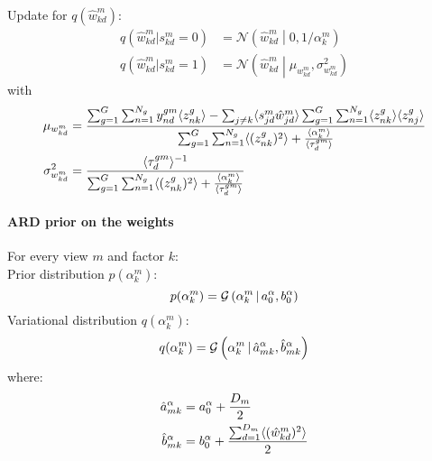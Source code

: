 Update for $q(\hat{w}_{kd}^m)$:
\begin{equation} \begin{aligned}
      q(\hat{w}_{kd}^m|s_{kd}^m=0) &= \mathcal{N} \left(\hat{w}_{kd}^m \middle| 0, 1/\alpha_k^m \right) \\
      q(\hat{w}_{kd}^m|s_{kd}^m=1) &= \mathcal{N} \left( \hat{w}_{kd}^m \middle| \mu_{w_{kd}^m}, \sigma_{w_{kd}^m}^2\right)
  \end{aligned} \end{equation}
with
\begin{equation} \begin{aligned}
  	\mu_{w_{kd}^m} &= \frac{ \sum_{g=1}^G\sum_{n=1}^{N_g} y_{nd}^{gm} \langle z^g_{nk} \rangle - \sum_{j \neq k} \langle s_{jd}^m\hat{w}_{jd}^m \rangle \sum_{g=1}^G\sum_{n=1}^{N_g} \langle z^g_{nk} \rangle \langle z^g_{nj} \rangle } { \sum_{g=1}^G\sum_{n=1}^{N_g} \langle (z_{nk}^g)^2 \rangle + \frac{\langle\alpha_k^m\rangle}{\langle\tau_d^{gm}\rangle} }\\
  	\sigma_{w_{kd}^m}^2 &= \frac{ \langle\tau_d^{gm}\rangle^{-1} } { \sum_{g=1}^G\sum_{n=1}^{N_g} \langle (z_{nk}^g)^2 \rangle + \frac{\langle\alpha_k^m\rangle}{\langle\tau_d^{gm}\rangle} }
\end{aligned} \end{equation}



\paragraph*{ARD prior on the weights}

For every view $m$ and factor $k$: \\

Prior distribution $p(\alpha_k^m)$:
\[
	p(\alpha_k^m) = \mathcal{G}\left(\alpha_k^m \,|\, a_0^\alpha, b_0^\alpha\right)
\]
Variational distribution $q(\alpha_k^m)$:
\begin{equation}
    q(\alpha^m_{k}) = \mathcal{G}\left(\alpha_k^m \,|\, \hat{a}_{mk}^{\alpha}, \hat{b}_{mk}^{\alpha}\right)
\end{equation}
where:
\begin{equation} \begin{aligned}
	\hat{a}_{mk}^\alpha &= a_0^\alpha + \frac{D_m}{2}\\
	\hat{b}_{mk}^\alpha &= b_0^\alpha +\frac{ \sum_{d=1}^{D_m} \langle (\hat{w}_{kd}^m)^2 \rangle }{2}
\end{aligned} \end{equation}


